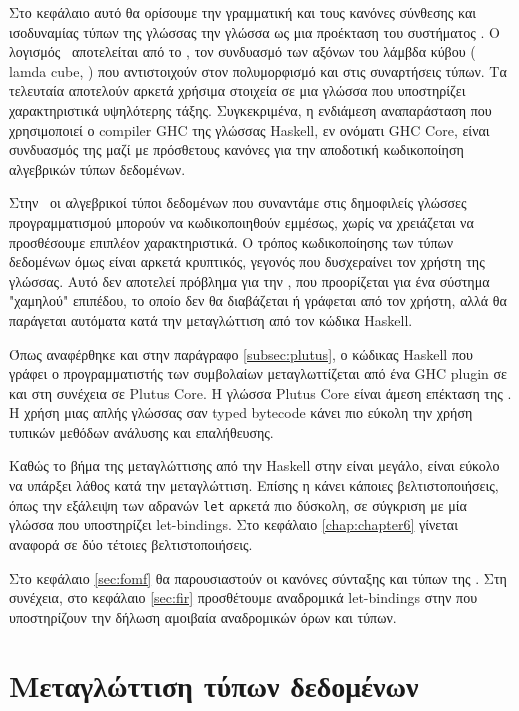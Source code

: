\documentclass[diploma]{softlab-thesis}
\begin{document}
Στο κεφάλαιο αυτό θα ορίσουμε την γραμματική και τους κανόνες σύνθεσης και ισοδυναμίας τύπων
της γλώσσας την γλώσσα \FIR{} ως μια προέκταση του συστήματος \FOMF. Ο λογισμός \FOMF 
~αποτελείται από το \FOM , τον συνδυασμό των αξόνων του λάμβδα κύβου ( lamda cube, \cite{lambdacube} ) 
που αντιστοιχούν στον πολυμορφισμό και στις συναρτήσεις τύπων. Τα τελευταία αποτελούν αρκετά 
χρήσιμα στοιχεία σε μια γλώσσα που υποστηρίζει χαρακτηριστικά υψηλότερης τάξης. Συγκεκριμένα,
η ενδιάμεση αναπαράσταση που χρησιμοποιεί ο compiler GHC της γλώσσας Haskell, εν ονόματι GHC Core,
είναι συνδυασμός της \FOM μαζί με πρόσθετους κανόνες για την αποδοτική κωδικοποίηση αλγεβρικών
τύπων δεδομένων.

Στην \FOMF ~οι αλγεβρικοί τύποι δεδομένων που συναντάμε στις δημοφιλείς γλώσσες προγραμματισμού
μπορούν να κωδικοποιηθούν εμμέσως, χωρίς να χρειάζεται να προσθέσουμε επιπλέον χαρακτηριστικά.
Ο τρόπος κωδικοποίησης των τύπων δεδομένων όμως είναι αρκετά κρυπτικός, γεγονός που δυσχεραίνει
τον χρήστη της γλώσσας. Αυτό δεν αποτελεί πρόβλημα για την \FOMF , που προορίζεται για ένα σύστημα 
"χαμηλού" επιπέδου, το οποίο δεν θα διαβάζεται ή γράφεται από τον χρήστη, αλλά θα παράγεται αυτόματα
κατά την μεταγλώττιση από τον κώδικα Haskell. 


Όπως αναφέρθηκε και στην παράγραφο \ref{subsec:plutus}, ο κώδικας Haskell που γράφει ο 
προγραμματιστής των συμβολαίων μεταγλωττίζεται από ένα GHC plugin σε \FIR{} και στη συνέχεια
σε Plutus Core. Η γλώσσα Plutus Core είναι άμεση επέκταση της \FOMF. Η χρήση μιας απλής γλώσσας
σαν typed bytecode κάνει πιο εύκολη την χρήση τυπικών μεθόδων ανάλυσης και επαλήθευσης.


Καθώς το βήμα της μεταγλώττισης από την Haskell στην \FOMF{} είναι μεγάλο, είναι εύκολο να υπάρξει
λάθος κατά την μεταγλώττιση. Επίσης η \FOMF{} κάνει κάποιες βελτιστοποιήσεις, όπως την 
εξάλειψη των αδρανών \texttt{let} αρκετά πιο δύσκολη, σε σύγκριση με μία γλώσσα που υποστηρίζει
let-bindings. Στο κεφάλαιο \ref{chap:chapter6} γίνεται αναφορά σε δύο τέτοιες βελτιστοποιήσεις.

Στο κεφάλαιο \ref{sec:fomf} θα παρουσιαστούν οι κανόνες σύνταξης και τύπων της \FOMF. Στη συνέχεια,
στο κεφάλαιο  \ref{sec:fir}  προσθέτουμε αναδρομικά let-bindings στην \FOMF που υποστηρίζουν την
δήλωση αμοιβαία αναδρομικών όρων και τύπων.









\chapter{Μεταγλώττιση τύπων δεδομένων}
\label{chap:chapter5}
\end{document}
